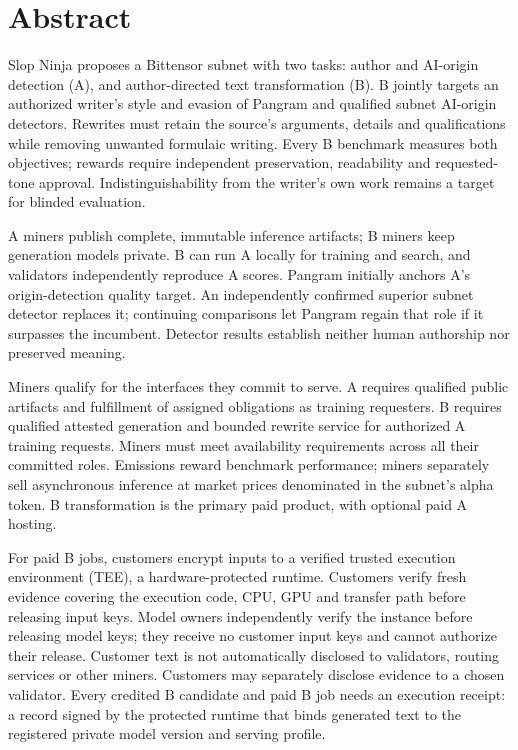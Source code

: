 \section*{Abstract}\label{abstract}

Slop Ninja proposes a Bittensor subnet with two tasks: author and
AI-origin detection (A), and author-directed text transformation (B).
B jointly targets an authorized writer's style and evasion of Pangram
and qualified subnet AI-origin detectors. Rewrites must retain the
source's arguments, details and qualifications while removing unwanted
formulaic writing. Every B benchmark measures both objectives; rewards
require independent preservation, readability and requested-tone approval.
Indistinguishability from the writer's own work remains a target for
blinded evaluation.

A miners publish complete, immutable inference artifacts; B miners keep
generation models private. B can run A locally for training and search,
and validators independently reproduce A scores. Pangram initially
anchors A's origin-detection quality target. An independently confirmed
superior subnet detector replaces it; continuing comparisons let Pangram
regain that role if it surpasses the incumbent. Detector results establish
neither human authorship nor preserved meaning.

Miners qualify for the interfaces they commit to serve.
A requires qualified public artifacts and fulfillment of assigned
obligations as training requesters. B requires qualified attested generation
and bounded rewrite service for authorized A training requests.
Miners must meet availability requirements across all their committed roles.
Emissions reward benchmark performance; miners separately sell
asynchronous inference at market prices denominated in the subnet's
alpha token. B transformation is the primary paid product, with optional
paid A hosting.

For paid B jobs, customers encrypt inputs to a verified trusted execution
environment (TEE), a hardware-protected runtime. Customers verify fresh
evidence covering the execution code, CPU, GPU and transfer path before
releasing input keys. Model owners independently
verify the instance before releasing model keys; they receive no customer
input keys and cannot authorize their release. Customer text is not
automatically disclosed to validators, routing services or other miners.
Customers may separately disclose evidence to a chosen validator.
Every credited B candidate and paid B job needs an execution receipt:
a record signed by the protected runtime that binds generated text to
the registered private model version and serving profile.

